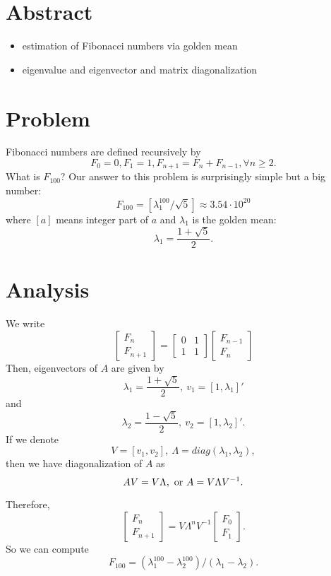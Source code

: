 \documentclass{article}
\begin{document}
\section{Abstract}
\begin{itemize}
 \item estimation of Fibonacci numbers via golden mean
 \item eigenvalue and eigenvector and matrix diagonalization
\end{itemize}

\section{Problem}
Fibonacci numbers are defined recursively by
$$F_{0} = 0, F_{1} = 1, F_{n+1} = F_{n} + F_{n-1}, \forall n\ge 2.$$
What is $F_{100}$?
Our answer to this problem is surprisingly simple but a big number:
$$F_{100} = [\lambda_{1}^{100}/\sqrt 5] \approx 3.54\cdot 10^{20}$$
where $[a]$ means integer part of $a$ and $\lambda_{1}$ is the golden mean:
$$\lambda_{1} = \frac{1+ \sqrt 5}{2}.$$

\section{Analysis}
We write 
$$\left[ 
\begin{array}
 {ll}
 F_{n} \\
 F_{n+1}
\end{array}
\right]
= 
\left[ 
\begin{array}
 {ll}
 0 & 1 \\
1 & 1
\end{array}
\right]
\left[ 
\begin{array}
 {ll}
 F_{n-1} \\
 F_{n}
\end{array}
\right]
$$
Then, eigenvectors of $A$ are given by
$$\lambda_{1} = \frac{1+\sqrt 5}{2}, \ v_{1} = [1, \lambda_{1}]'$$
and 
$$\lambda_{2} = \frac{1 - \sqrt 5}{2}, \ v_{2} = [1, \lambda_{2}]'.$$
If we denote
$$V = [v_{1}, v_{2}], \ \Lambda = diag(\lambda_{1}, \lambda_{2}),$$
then we have diagonalization of $A$ as
$$AV = V\Lambda, \hbox{ or } A = V \Lambda V^{-1}.$$

Therefore, 
$$
\left[
\begin{array}
 {ll}
 F_{n} \\
 F_{n+1}
\end{array}
\right]
= 
V \Lambda^{n} V^{-1} 
\left[
\begin{array}
 {ll}
 F_{0} \\
 F_{1}
\end{array}
\right].
$$
So we can compute 
$$F_{100} = (\lambda_{1}^{100} - \lambda_{2}^{100})/(\lambda_{1} - 
\lambda_{2}).$$
\end{document}
